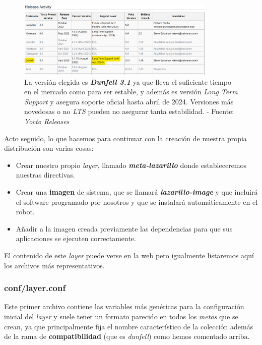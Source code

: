 \begin{figure}[h]
	\centering
	\includegraphics[width=0.85\textwidth]{imagenes/yocto-releases.png}
	\caption{La versión elegida es \textbf{\textit{Dunfell 3.1}} ya que lleva el suficiente tiempo en el mercado como para ser estable, y además es versión \textit{Long Term Support} y asegura soporte oficial hasta abril de 2024. Versiones más novedosas o no \textit{LTS} pueden no asegurar tanta estabilidad. - Fuente: \textit{Yocto Releases} \cite{yocto-releases}}
\end{figure}

Acto seguido, lo que hacemos para continuar con la creación de nuestra propia distribución son varias cosas:

\begin{itemize}
	\item Crear nuestro propio \textit{layer}, llamado \textbf{\textit{meta-lazarillo}} donde estableceremos nuestras directivas.
	\item Crear una \textbf{imagen} de sistema, que se llamará \textbf{\textit{lazarillo-image}} y que incluirá el software programado por nosotros y que se instalará automáticamente en el robot.
	\item Añadir a la imagen creada previamente las dependencias para que sus aplicaciones se ejecuten correctamente.
\end{itemize}

El contenido de este \textit{layer} puede verse en la web \cite{meta-lazarillo} pero igualmente listaremos aquí los archivos más representativos.\\

\subsubsection{conf/layer.conf}

Este primer archivo contiene las variables más genéricas para la configuración inicial del \textit{layer} y suele tener un formato parecido en todos los \textit{metas} que se crean, ya que principalmente fija el nombre característico de la colección además de la rama de \textbf{compatibilidad} (que es \textit{dunfell}) como hemos comentado arriba. 

